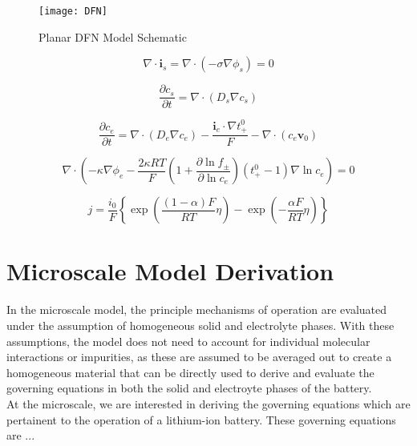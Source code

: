 \documentclass[lettersize,journal]{IEEEtran}
\begin{document}
\begin{figure}
  \centering
  \texttt{[image: DFN]}
  \caption{Planar DFN Model Schematic}
  \label{DFN_schematic}
\end{figure}

\begin{equation} \label{COC_s}
\nabla \cdot \mathbf{i}_{s}=\nabla \cdot\left(-\sigma \nabla \phi_{s}\right)=0
\end{equation}

\begin{equation} \label{COM_s}
\frac{\partial c_{s}}{\partial t}=\nabla \cdot\left(D_{s} \nabla c_{s}\right)
\end{equation}

\begin{equation} \label{COM_e}
\frac{\partial c_{e}}{\partial t}=\nabla \cdot\left(D_{e} \nabla c_{e}\right)-\frac{\mathbf{i}_{e} \cdot \nabla t_{+}^{0}}{F}-\nabla \cdot\left(c_{e} \mathbf{v}_{0}\right)
\end{equation}

\begin{equation}\label{COC_e}
\nabla \cdot\left(-\kappa \nabla \phi_{e}-\frac{2 \kappa R T}{F}\left(1+\frac{\partial \ln f_{\pm}}{\partial \ln c_{e}}\right)\left(t_{+}^{0}-1\right) \nabla \ln c_{e}\right)=0
\end{equation}

\begin{equation} \label{lithium_movment}
j=\frac{i_{0}}{F}\left\{\exp \left(\frac{(1-\alpha) F}{R T} \eta\right)-\exp \left(-\frac{\alpha F}{R T} \eta\right)\right\}
\end{equation}

\section{Microscale Model Derivation}

 In the microscale model, the principle mechanisms of operation are evaluated under the assumption of homogeneous solid and electrolyte phases. With these assumptions, the model does not need to account for individual molecular interactions or impurities, as these are assumed to be averaged out to create a homogeneous material that can be directly used to derive and evaluate the governing equations in both the solid and electroyte phases of the battery. \\

 At the microscale, we are interested in deriving the governing equations which are pertainent to the operation of a lithium-ion battery. These governing equations are ...\\
\end{document}

